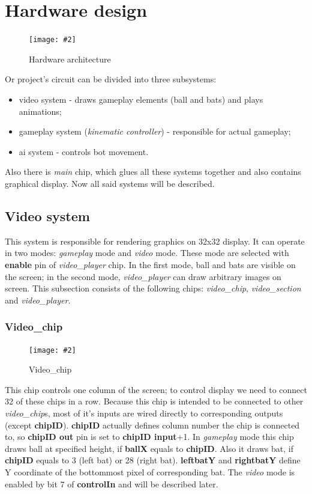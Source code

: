 \documentclass[12pt,a4paper]{article}
\let\oldsection\section
\renewcommand\section{\clearpage\oldsection}
\newcommand{\dofigure}[3][H]{
    \begin{figure}[#1]
        \centering
        \texttt{[image: \#2]}
        \caption{#3}
    \end{figure}
}
\newcommand{\chip}[1]{{\itshape#1}}
\newcommand{\pin}[1]{\textbf{#1}}
\begin{document}
    \section{Hardware design}
    \dofigure{scheme.png}{Hardware architecture}
    Or project's circuit can be divided into three subsystems:
    \begin{itemize}
        \item video system - draws gameplay elements (ball and bats) and plays animations;
        \item gameplay system (\chip{kinematic controller}) - responsible for actual gameplay;
        \item ai system - controls bot movement.
    \end{itemize}
    Also there is \chip{main} chip, which glues all these systems together and also contains graphical display.
    Now all said systems will be described.

    

    \subsection{Video system}
    This system is responsible for rendering graphics on 32x32 display. It can operate in two modes: {\itshape gameplay} mode and {\itshape video} mode. These mode are selected with \pin{enable} pin of \chip{video\_player} chip. In the first mode, ball and bats are visible on the screen; in the second mode, \chip{video\_player} can draw arbitrary images on screen. This subsection consists of the following chips: 
    \chip{video\_chip}, \chip{video\_section} and \chip{video\_player}.

    \subsubsection{Video\_chip}
    \dofigure{video_chip}{Video\_chip}
    This chip controls one column of the screen; to control display we need to connect 32 of these chips in a row. Because this chip is intended to be connected to other \chip{video\_chip}s, most of it's inputs are wired directly to corresponding outputs (except \pin{chipID}). \pin{chipID} actually defines column number the chip is connected to, so \pin{chipID out} pin is set to \pin{chipID input}+1.
    In {\itshape gameplay} mode this chip draws ball at specified height, if \pin{ballX}  equals to \pin{chipID}. Also it draws bat, if \pin{chipID} equals to 3 (left bat) or 28 (right bat). \pin{leftbatY} and \pin{rightbatY} define Y coordinate of the bottommost pixel of corresponding bat. The {\itshape video} mode is enabled by bit 7 of \pin{controlIn} and will be described later.
\end{document}
